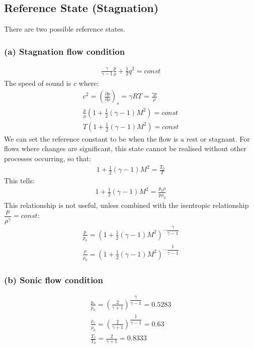 \documentclass[class=report, crop=false, 12pt,a4paper]{standalone}
\begin{document}
\subsection{Reference State (Stagnation)}
There are two possible reference states. 
\subsubsection{(a) Stagnation flow condition}
\begin{gather}
    \frac{\gamma}{\gamma - 1} \frac{p}{\rho} + \frac{1}{2}q^2 = const
\end{gather}
The speed of sound is $c$ where: 
\begin{gather}
    c^2 = \left( \frac{\partial p}{\partial \rho} \right)_s = \gamma R T = \frac{\gamma p}{\rho} \\[5pt]
    \frac{p}{\rho} \left( 1 + \frac{1}{2}(\gamma-1)M^2 \right) = const \\[5pt] 
    T \left( 1 + \frac{1}{2}(\gamma - 1)M^2 \right) = const
\end{gather}
We can set the reference constant to be when the flow is a rest or stagnant. For flows where changes are significant, this state cannot be realised without other processes occurring, so that: 
\begin{gather}
    1 + \frac{1}{2}(\gamma - 1)M^2 = \frac{T_0}{T}
\end{gather}
This tells: 
\begin{gather}
    1 + \frac{1}{2}(\gamma - 1)M^2 = \frac{p_0 \rho}{p \rho_0}
\end{gather}
This relationship is not useful, unless combined with the isentropic relationship $\dfrac{p}{\rho^{\gamma}} = const$: 
\begin{gather}
    \frac{p}{p_0} = \left( 1 + \frac{1}{2}(\gamma-1)M^2 \right)^{-\dfrac{\gamma}{\gamma-1}} \\[5pt]
    \frac{\rho}{\rho_0} = \left( 1 + \frac{1}{2}(\gamma-1)M^2 \right)^{-\dfrac{1}{\gamma-1}} 
\end{gather}
\subsubsection{(b) Sonic flow condition} 
\begin{gather}
    \frac{p_{*}}{p_0} = \left( \frac{2}{\gamma+1} \right)^{\dfrac{\gamma}{\gamma-1}} = 0.5283 \\[5pt]
    \frac{\rho_{*}}{\rho_0} = \left( \frac{2}{\gamma+1} \right)^{\dfrac{1}{\gamma-1}} = 0.63 \\[5pt] 
    \frac{T_{*}}{T_0} = \frac{2}{\gamma+1} = 0.8333
\end{gather}
\end{document}
